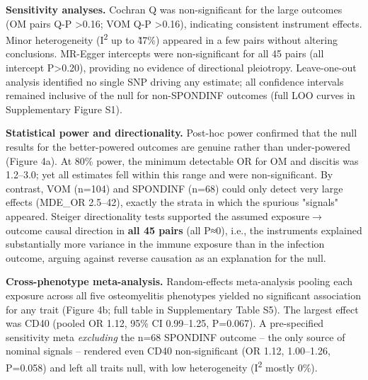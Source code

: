 \documentclass[11pt]{article}
\begin{document}
\textbf{Sensitivity analyses.} Cochran Q was non-significant for the large outcomes (OM pairs Q-P >0.16; VOM Q-P >0.16), indicating consistent instrument effects. Minor heterogeneity (I\textsuperscript{2} up to \~47\%) appeared in a few pairs without altering conclusions. MR-Egger intercepts were non-significant for all 45 pairs (all intercept P>0.20), providing no evidence of directional pleiotropy. Leave-one-out analysis identified no single SNP driving any estimate; all confidence intervals remained inclusive of the null for non-SPONDINF outcomes (full LOO curves in Supplementary Figure S1).

\textbf{Statistical power and directionality.} Post-hoc power confirmed that the null results for the better-powered outcomes are genuine rather than under-powered (Figure 4a). At 80\% power, the minimum detectable OR for OM and discitis was 1.2--3.0; yet all estimates fell within this range and were non-significant. By contrast, VOM (n=104) and SPONDINF (n=68) could only detect very large effects (MDE\_OR 2.5--42), exactly the strata in which the spurious "signals" appeared. Steiger directionality tests supported the assumed exposure$\rightarrow$ outcome causal direction in \textbf{all 45 pairs} (all P≈0), i.e., the instruments explained substantially more variance in the immune exposure than in the infection outcome, arguing against reverse causation as an explanation for the null.

\textbf{Cross-phenotype meta-analysis.} Random-effects meta-analysis pooling each exposure across all five osteomyelitis phenotypes yielded no significant association for any trait (Figure 4b; full table in Supplementary Table S5). The largest effect was CD40 (pooled OR 1.12, 95\% CI 0.99--1.25, P=0.067). A pre-specified sensitivity meta \emph{excluding} the n=68 SPONDINF outcome -- the only source of nominal signals -- rendered even CD40 non-significant (OR 1.12, 1.00--1.26, P=0.058) and left all traits null, with low heterogeneity (I\textsuperscript{2} mostly 0\%).
\end{document}

